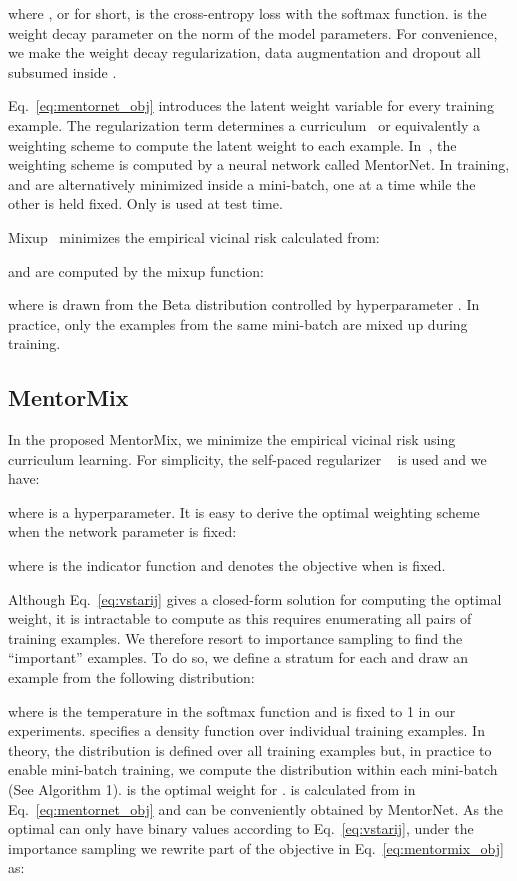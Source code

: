 \documentclass{article}
\begin{document}
where , or  for short, is the cross-entropy loss with the softmax function.  is the weight decay parameter on the  norm of the model parameters. For convenience, we make the weight decay regularization, data augmentation and dropout all subsumed inside .

Eq.~\eqref{eq:mentornet_obj} introduces the latent weight variable  for every training example. The regularization term  determines a curriculum~\cite{jiang2015self,jiang2014self,fan2017self} or equivalently a weighting scheme to compute the latent weight  to each example. In~\citep{jiang2018mentornet}, the weighting scheme is computed by a neural network called MentorNet. In training,  and  are alternatively minimized inside a mini-batch, one at a time while the other is held fixed. Only  is used at test time.


Mixup~\citep{zhang2018mixup} minimizes the empirical vicinal risk calculated from:

 and  are computed by the mixup function:

where  is drawn from the Beta distribution  controlled by hyperparameter . In practice, only the examples from the same mini-batch are mixed up during training.


\subsection{MentorMix}
In the proposed MentorMix, we minimize the empirical vicinal risk using curriculum learning. For simplicity, the self-paced regularizer ~\cite{kumar2010self,jiang2015self} is used and we have:

where  is a hyperparameter. It is easy to derive the optimal weighting scheme when the network parameter  is fixed:

where  is the indicator function and  denotes the objective when  is fixed.

Although Eq.~\eqref{eq:vstarij} gives a closed-form solution for computing the optimal weight, it is intractable to compute as this requires enumerating all pairs of training examples. 
We therefore resort to importance sampling to find the ``important'' examples. To do so, we define a stratum for each  and draw an example from the following distribution:

where  is the temperature in the softmax function and is fixed to 1 in our experiments.  specifies a density function over individual training examples. In theory, the distribution is defined over all training examples but, in practice to enable mini-batch training, we compute the distribution within each mini-batch (See Algorithm 1).  is the optimal weight for .  is calculated from  in Eq.~\eqref{eq:mentornet_obj} and can be conveniently obtained by MentorNet. As the optimal  can only have binary values according to Eq.~\eqref{eq:vstarij}, under the importance sampling we rewrite part of the objective in Eq.~\eqref{eq:mentormix_obj} as:
\end{document}
